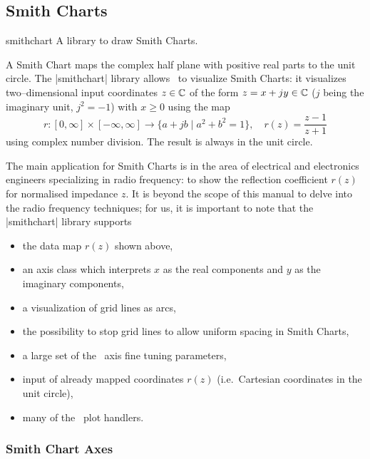 \subsection{Smith Charts}

\begin{pgfplotslibrary}{smithchart}
	A library to draw Smith Charts.

	A Smith Chart maps the complex half plane with positive real parts to the unit circle. The |smithchart| library allows \PGFPlots\ to visualize Smith Charts: it visualizes two--dimensional input coordinates $z \in \mathbb{C} $ of the form $z = x+ j y \in \mathbb{C}$ ($j$ being the imaginary unit, $j^2=-1$) with $x \ge 0$ using the map
	\[ r\colon [0,\infty] \times [-\infty,\infty] \to \{ a+j b \;\vert\;  a^2 + b^2 = 1 \}, \quad r(z) = \frac{z-1}{z+1} \]
	using complex number division. The result is always in the unit circle.

	The main application for Smith Charts is in the area of electrical and electronics engineers specializing in radio frequency: to show the reflection coefficient $r(z)$ for normalised impedance $z$. It is beyond the scope of this manual to delve into the radio frequency techniques; for us, it is important to note that the |smithchart| library supports
	\begin{itemize}
		\item the data map $r(z)$ shown above,
		\item an axis class which interprets $x$ as the real components and $y$ as the imaginary components,
		\item a visualization of grid lines as arcs,
		\item the possibility to stop grid lines to allow uniform spacing in Smith Charts,
		\item a large set of the \PGFPlots\ axis fine tuning parameters,
		\item input of already mapped coordinates $r(z)$ (i.e.\ Cartesian coordinates in the unit circle),
		\item many of the \PGFPlots\ plot handlers.
	\end{itemize}
\end{pgfplotslibrary}

\subsubsection{Smith Chart Axes}

